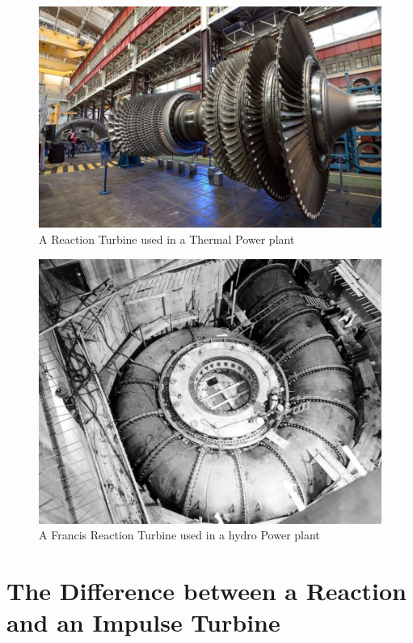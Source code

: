 \documentclass[11pt]{article}
\begin{document}
\begin{figure}[H]
	\centering
	\includegraphics[scale=0.4]{reaction turbine thermal.jpg}
	\caption{A Reaction Turbine used in a Thermal Power plant}
	\label{it}
\end{figure}

\begin{figure}[H]
	\centering
	\includegraphics[scale=0.4]{reaction turbine hydro.jpg}
	\caption{A Francis Reaction Turbine used in a hydro Power plant}
	\label{it}
\end{figure}

\section{The Difference between a Reaction and an Impulse Turbine}
\end{document}
